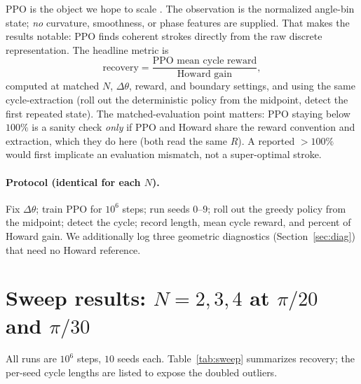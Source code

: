 \documentclass[11pt]{article}
\begin{document}
PPO is the object we hope to scale \cite{schulman2017ppo,suttonbarto2018}. The observation is the normalized
angle-bin state; \emph{no} curvature, smoothness, or phase features are
supplied. That makes the results notable: PPO finds coherent strokes directly
from the raw discrete representation. The headline metric is
\[
    \text{recovery} = \frac{\text{PPO mean cycle reward}}{\text{Howard gain}},
\]
computed at matched $N$, $\Delta\theta$, reward, and boundary settings, and
using the same cycle-extraction (roll out the deterministic policy from the
midpoint, detect the first repeated state). The matched-evaluation point
matters: PPO staying below $100\%$ is a sanity check \emph{only} if PPO and
Howard share the reward convention and extraction, which they do here (both
read the same $R$). A reported $>100\%$ would first implicate an evaluation
mismatch, not a super-optimal stroke.

\paragraph{Protocol (identical for each $N$).}
Fix $\Delta\theta$; train PPO for $10^6$ steps; run seeds $0$--$9$; roll out the
greedy policy from the midpoint; detect the cycle; record length, mean cycle
reward, and percent of Howard gain. We additionally log three geometric
diagnostics (Section~\ref{sec:diag}) that need no Howard reference.

\section{Sweep results: $N=2,3,4$ at $\pi/20$ and $\pi/30$}
\label{sec:results}

All runs are $10^6$ steps, $10$ seeds each. Table~\ref{tab:sweep} summarizes
recovery; the per-seed cycle lengths are listed to expose the doubled outliers.
\end{document}
